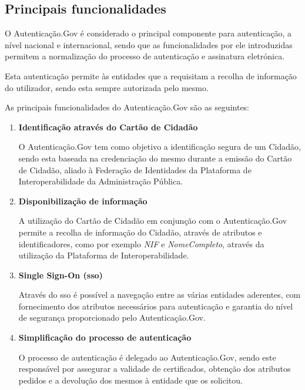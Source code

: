 \subsection{Principais funcionalidades} \label{authGovFuncionalidades}

O Autenticação.Gov é considerado o principal componente para autenticação, a nível nacional e internacional, sendo que as funcionalidades por ele introduzidas permitem a normalização do processo de autenticação e assinatura eletrónica.

Esta autenticação permite às entidades que a requisitam a recolha de informação do utilizador, sendo esta sempre autorizada pelo mesmo.

As principais funcionalidades do Autenticação.Gov são as seguintes:

\begin{enumerate}
    \item \textbf{Identificação através do Cartão de Cidadão}
    
    O Autenticação.Gov tem como objetivo a identificação segura de um Cidadão, sendo esta baseada na credenciação do mesmo durante a emissão do Cartão de Cidadão, aliado à Federação de Identidades da Plataforma de Interoperabilidade da Administração Pública.
    
    \item \textbf{Disponibilização de informação}
    
    A utilização do Cartão de Cidadão em conjunção com o Autenticação.Gov permite a recolha de informação do Cidadão, através de atributos e identificadores, como por exemplo \textit{NIF} e \textit{NomeCompleto}, através da utilização da Plataforma de Interoperabilidade.
    
    \item \textbf{Single Sign-On (\gls{sso})}
    
    Através do \gls{sso} é possível a navegação entre as várias entidades aderentes, com fornecimento dos atributos necessários para autenticação e garantia do nível de segurança proporcionado pelo Autenticação.Gov.
    
    \item \textbf{Simplificação do processo de autenticação}
    
    O processo de autenticação é delegado ao Autenticação.Gov, sendo este responsável por assegurar a validade de certificados, obtenção dos atributos pedidos e a devolução dos mesmos à entidade que os solicitou.
    

\end{enumerate}
